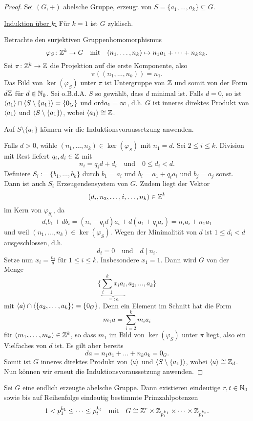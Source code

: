 \begin{proof}
	Sei $(G, +)$ abelsche Gruppe, erzeugt von $S = \{a_1, \dots, a_k\} \subseteq G$. 
	
	\underline{Induktion über $k$:} Für $k = 1$ ist $G$ zyklisch.
	
	Betrachte den surjektiven Gruppenhomomorphismus
	\[\varphi_S \colon \mathbb{Z}^k \to G \quad\text{mit}\quad(n_1, \dots, n_k) \mapsto n_1a_1 + \dots + n_ka_k.\]
	Sei $\pi \colon \mathbb{Z}^k \to \mathbb{Z}$ die Projektion auf die erste Komponente, also
	\[\pi((n_1, \dots, n_k)) = n_1.\]
	Das Bild von $\ker(\varphi_S)$ unter $\pi$ ist Untergruppe von $\mathbb{Z}$ und somit von der Form $d\mathbb{Z}$ für $d \in \mathbb{N}_0$. Sei o.B.d.A. $S$ so gewählt, dass $d$ minimal ist. Falls $d = 0$, so ist $\langle a_1 \rangle \cap \langle S\setminus\{a_1\} \rangle= \{0_G\}$ und $\mathrm{ord}{a_1} = \infty$, d.h. $G$ ist inneres direktes Produkt von $\langle a_1 \rangle$ und $\langle S\setminus\{a_1\} \rangle$, wobei $\langle a_1 \rangle \cong \mathbb{Z}$.
	
	Auf $S\setminus\{a_1\}$ können wir die Induktionsvoraussetzung anwenden. 
	
	Falls $d > 0$, wähle $(n_1, \dots, n_k) \in \ker(\varphi_S)$ mit $n_1 = d$. Sei $2 \leq i \leq k$. Division mit Rest liefert $q_i, d_i \in \mathbb{Z}$ mit
	\[n_i = q_i d + d_i \quad\text{und}\quad 0 \leq d_i < d.\]
	Definiere $S_i := \{b_1, \dots, b_k\}$ durch $b_1 = a_i$ und $b_i = a_1 + q_i a_i$ und $b_j = a_j$ sonst. Dann ist auch $S_i$ Erzeugendensystem von $G$. Zudem liegt der Vektor
	\[(d_i, n_2, \dots, i, \dots, n_k) \in \mathbb{Z}^k\]
	im Kern von $\varphi_{S_i}$, da
	\[d_ib_1 + db_i = (n_i - q_id)a_i + d(a_1 + q_ia_i) = n_ia_i + n_1a_1\]
	und weil $(n_1, \dots, n_k) \in \ker(\varphi_S)$. Wegen der Minimalität von $d$ ist $1 \leq d_i < d$ ausgeschlossen, d.h.
	\[d_i = 0 \quad\text{und}\quad d \mid n_i.\]
	Setze nun $x_i = \frac{n_i}{d}$ für $1 \leq i \leq k$. Insbesondere $x_1 = 1$. Dann wird $G$ von der Menge
	\[\bigg\{\underbrace{\sum_{i=1}^k x_ia_i}_{=: a} , a_2, \dots, a_k\bigg\}\]
	mit $\langle a \rangle \cap \langle \{a_2, \dots, a_k\} \rangle = \{0_G\}$. Denn ein Element im Schnitt hat die Form 
	\[m_1a = \sum_{i=2}^k m_ia_i\]
	für $(m_1, \dots, m_k) \in \mathbb{Z}^k$, so dass $m_1$ im Bild von $\ker(\varphi_S)$ unter $\pi$ liegt, also ein Vielfaches von $d$ ist. Es gilt aber bereits
	\[da = n_1 a_1 + \dots + n_ka_k = 0_G.\]
	Somit ist $G$ inneres direktes Produkt von $\langle a \rangle$ und $\langle S \setminus \{a_1\} \rangle$, wobei  $\langle a \rangle \cong \mathbb{Z}_d$. Nun können wir erneut die Induktionsvoraussetzung anwenden.
\end{proof}
\begin{kor}\label{kor2_12}
	Sei $G$ eine endlich erzeugte abelsche Gruppe. Dann existieren eindeutige $r,t \in \mathbb{N}_0$ sowie bis auf Reihenfolge eindeutig bestimmte Primzahlpotenzen 
	\[1 < p_1^{k_1} \leq \dots \leq p_t^{k_t} \quad\text{mit}\quad G \cong \mathbb{Z}^r \times \mathbb{Z}_{p_1^{k_1}} \times \dots \times \mathbb{Z}_{p_t^{k_t}}.\]
\end{kor}
